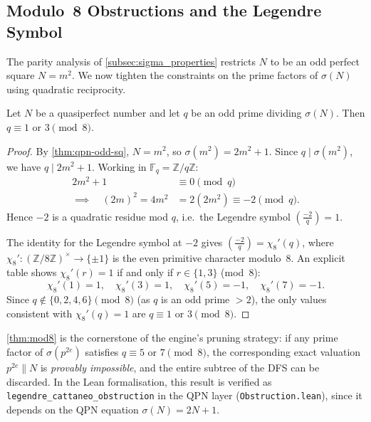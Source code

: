 \subsection{Modulo~8 Obstructions and the Legendre Symbol}
\label{subsec:mod8_obstructions}

The parity analysis of \cref{subsec:sigma_properties} restricts $N$ to be an
odd perfect square $N = m^{2}$.  We now tighten the constraints on the prime
factors of $\sigma(N)$ using quadratic reciprocity.

\begin{theorem}\label{thm:mod8}
Let $N$ be a quasiperfect number and let $q$ be an odd prime dividing
$\sigma(N)$.  Then $q \equiv 1$ or $3 \pmod{8}$.
\end{theorem}

\begin{proof}
By \cref{thm:qpn-odd-sq}, $N = m^{2}$, so $\sigma(m^{2}) = 2m^{2}+1$.
Since $q \mid \sigma(m^2)$, we have $q \mid 2m^2+1$.
Working in $\mathbb{F}_q = \mathbb{Z}/q\mathbb{Z}$:
\begin{align*}
  2m^2 + 1 &\equiv 0 \pmod{q} \\
  \implies \quad (2m)^2 = 4m^2 &= 2(2m^2) \equiv -2 \pmod{q}.
\end{align*}
Hence $-2$ is a quadratic residue mod $q$, i.e.\ the Legendre symbol
$\left(\tfrac{-2}{q}\right)=1$.

The identity for the Legendre symbol at $-2$ gives
$\left(\tfrac{-2}{q}\right) = \chi_8'(q)$, where
$\chi_8'\colon (\mathbb{Z}/8\mathbb{Z})^\times \to \{\pm 1\}$ is the
even primitive character modulo~8.
An explicit table shows $\chi_8'(r)=1$ if and only if $r \in \{1,3\}$
(mod~8):
\[
  \chi_8'(1)=1,\quad \chi_8'(3)=1,\quad \chi_8'(5)=-1,\quad \chi_8'(7)=-1.
\]
Since $q \not\in \{0,2,4,6\}\pmod 8$ (as $q$ is an odd prime $> 2$),
the only values consistent with $\chi_8'(q)=1$ are $q \equiv 1$ or $3 \pmod 8$.
\end{proof}

\cref{thm:mod8} is the cornerstone of the engine's pruning strategy: if any
prime factor of $\sigma(p^{2e})$ satisfies $q \equiv 5$ or $7 \pmod 8$, the
corresponding exact valuation $p^{2e} \parallel N$ is \emph{provably
impossible}, and the entire subtree of the DFS can be discarded.
In the Lean formalisation, this result is verified as
\texttt{legendre\_\allowbreak{}cattaneo\_\allowbreak{}obstruction}
in the QPN layer (\texttt{Obstruction.lean}), since it depends on the
QPN equation $\sigma(N) = 2N+1$.


